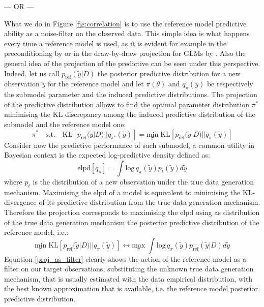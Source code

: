 \documentclass[american,]{article}
\theoremstyle{definition}
\begin{document}
--- OR ---

What we do in Figure \ref{fig:correlation} is to use the reference model predictive ability as a noise-filter on the observed data. This simple idea is what happens every time a reference model is used, as it is evident for example in the preconditioning by \cite{paper:paul_preconditioning} or in the draw-by-draw projection for GLMs by \cite{paper:original_proj}. Also the general idea of the projection of the predictive can be seen under this perspective. Indeed, let us call $p_{\text{ref}}(\tilde{y}|D)$ the posterior predictive distribution for a new observation $\tilde{y}$ for the reference model and let $\pi(\theta)$ and $q_{\pi}(\tilde{y})$ be respectively the submodel parameter and the induced predictive distributions. The projection of the predictive distribution allows to find the optimal parameter distribution $\pi^{*}$ minimising the KL discrepancy among the induced predictive distribution of the submodel and the reference model one:
\
\begin{equation} 
\pi^{*}\quad \text{s.t.} \quad \text{KL}[p_{\text{ref}}(\tilde{y}|D)||q_{\pi^{*}}(\tilde{y})]=\underset{\pi}{\text{min}} \; \text{KL}[p_{\text{ref}}(\tilde{y}|D)||q_{\pi}(\tilde{y})] 
\end{equation}
Consider now the predictive performance of such submodel, a common utility in Bayesian context is the expected log-predictive density defined as:
\
\begin{equation} 
\text{elpd}[q_{\pi}]=\int \text{log}\,q_{\pi}(\tilde{y})p_{t}(\tilde{y})d\tilde{y} 
\end{equation}
where $p_{t}$ is the distribution of a new observation under the true data generation mechanism. Maximising the elpd of a model is equivalent to minimising the KL-divergence of its predictive distribution from the true data generation mechanism. Therefore the projection corresponds to maximising the elpd using as distribution of the true data generation mechanism the posterior predictive distribution of the reference model, i.e.:
\
\begin{equation} \label{proj_as_filter}
\underset{\pi}{\text{min}} \; \text{KL}[p_{\text{ref}}(\tilde{y}|D)||q_{\pi}(\tilde{y})] \leftrightarrow \underset{\pi}{\text{max}} \; \int \text{log}\,q_{\pi}(\tilde{y})p_{\text{ref}}(\tilde{y}|D)d\tilde{y} 
\end{equation}
Equation \eqref{proj_as_filter} clearly shows the action of the reference model as a filter on our target observations, substituting the unknown true data generation mechanism, that is usually estimated with the data empirical distribution, with the best known approximation that is available, i.e. the reference model posterior predictive distribution.
\end{document}
